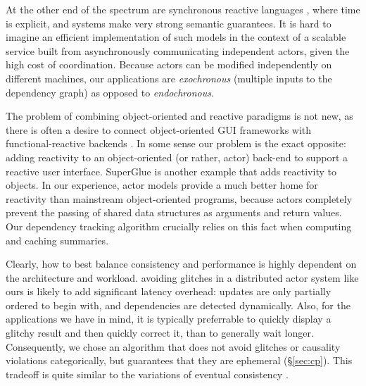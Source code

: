 At the other end of the spectrum are synchronous reactive languages \cite{lustre,signal,esterel,syncdataflow}, where time is explicit, and systems make very strong semantic guarantees. It is hard to imagine an efficient implementation of such models in the context of a scalable service built from asynchronously communicating independent actors, given the high cost of coordination. Because actors can be modified independently on different machines, our applications are \emph{exochronous} (multiple inputs to the dependency graph) as opposed to \emph{endochronous}.  

The problem of combining object-oriented and reactive paradigms is  not new, as there is often a desire to connect object-oriented GUI frameworks with functional-reactive backends \cite{statelines}. In some sense our problem is the exact opposite: adding reactivity to an object-oriented (or rather, actor) back-end to support a reactive user interface.  SuperGlue \cite{superglue} is another example that adds reactivity to objects. In our experience, actor models provide a much better home for reactivity than mainstream object-oriented programs, because actors completely prevent the passing of shared data structures as arguments and return values. Our dependency tracking algorithm crucially relies on this fact when computing and caching summaries.


Clearly, how to best balance consistency and performance is highly dependent on the architecture and workload. 
avoiding glitches in a distributed actor system like ours is likely to add significant latency overhead: updates are only partially ordered to begin with, and dependencies are detected dynamically. Also, for the applications we have in mind, it is typically preferrable to quickly display a glitchy result and then quickly correct it, than to generally wait longer. Consequently, we chose an algorithm that does not avoid glitches or causality violations categorically, but guarantees that they are ephemeral (\S\ref{sec:cp}). This tradeoff is quite similar to the variations of eventual consistency \cite{principles}.
 




